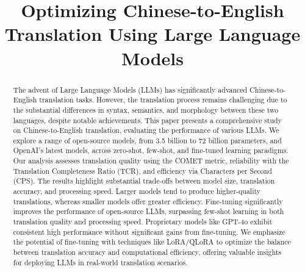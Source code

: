 \documentclass[conference]{IEEEtran}
\begin{document}

\title{Optimizing Chinese-to-English Translation Using Large Language Models}


\author{
}


\maketitle

\begin{abstract}
The advent of Large Language Models (LLMs) has significantly advanced Chinese-to-English translation tasks. However, the translation process remains challenging due to the substantial differences in syntax, semantics, and morphology between these two languages, despite notable achievements. This paper presents a comprehensive study on Chinese-to-English translation, evaluating the performance of various LLMs. We explore a range of open-source models, from 3.5 billion to 72 billion parameters, and OpenAI’s latest models, across zero-shot, few-shot, and fine-tuned learning paradigms. Our analysis assesses translation quality using the COMET metric, reliability with the Translation Completeness Ratio (TCR), and efficiency via Characters per Second (CPS). The results highlight substantial trade-offs between model size, translation accuracy, and processing speed. Larger models tend to produce higher-quality translations, whereas smaller models offer greater efficiency. Fine-tuning significantly improves the performance of open-source LLMs, surpassing few-shot learning in both translation quality and processing speed. Proprietary models like GPT-4o exhibit consistent high performance without significant gains from fine-tuning. We emphasize the potential of fine-tuning with techniques like LoRA/QLoRA to optimize the balance between translation accuracy and computational efficiency, offering valuable insights for deploying LLMs in real-world translation scenarios.
\end{abstract}
\end{document}
